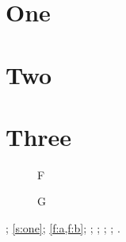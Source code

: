 \documentclass{article}
\begin{document}
\section{One}\label{s:one}
\section{Two}\label{s:two}
\section{Three}\label{s:three}
\begin{figure}\caption{F}\label{f:a}\end{figure}
\begin{figure}\caption{G}\label{f:b}\end{figure}
; \vref{s:one}; \vref{f:a,f:b}; ; ; ; ; .
\end{document}
